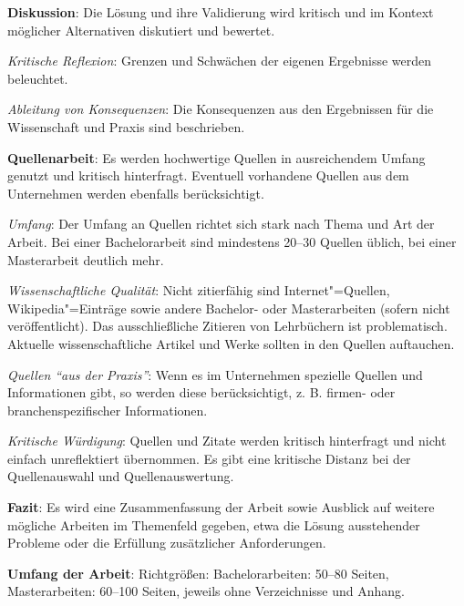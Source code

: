 \begin{checklist}
\begin{checklist}
    \end{checklist}
  \item \textbf{Diskussion}: Die Lösung und ihre Validierung wird kritisch und im Kontext möglicher Alternativen diskutiert und bewertet.
    \begin{checklist}
        \item \textit{Kritische Reflexion}: Grenzen und Schwächen der eigenen Ergebnisse werden beleuchtet.
        \item \textit{Ableitung von Konsequenzen}: Die Konsequenzen aus den Ergebnissen für die Wissenschaft und Praxis sind beschrieben.
    \end{checklist}
  \item \textbf{Quellenarbeit}: Es werden hochwertige Quellen in ausreichendem Umfang genutzt und kritisch hinterfragt. Eventuell vorhandene Quellen aus dem Unternehmen werden ebenfalls berücksichtigt.
    \begin{checklist}
        \item \textit{Umfang}: Der Umfang an Quellen richtet sich stark nach Thema und Art der Arbeit. Bei einer Bachelorarbeit sind mindestens 20--30 Quellen üblich, bei einer Masterarbeit deutlich mehr.
        \item \textit{Wissenschaftliche Qualität}: Nicht zitierfähig sind Internet"=Quellen, Wikipedia"=Einträge sowie andere Bachelor- oder Masterarbeiten (sofern nicht veröffentlicht). Das ausschließliche Zitieren von Lehrbüchern ist problematisch. Aktuelle wissenschaftliche Artikel und Werke sollten in den Quellen auftauchen.
        \item \textit{Quellen \enquote{aus der Praxis}}: Wenn es im Unternehmen spezielle Quellen und Informationen gibt, so werden diese berücksichtigt, z. B. firmen- oder branchenspezifischer Informationen.
        \item \textit{Kritische Würdigung}: Quellen und Zitate werden kritisch hinterfragt und nicht einfach unreflektiert übernommen. Es gibt eine kritische Distanz bei der Quellenauswahl und Quellenauswertung.
    \end{checklist}
  \item \textbf{Fazit}: Es wird eine Zusammenfassung der Arbeit sowie Ausblick auf weitere mögliche Arbeiten im Themenfeld gegeben, etwa die Lösung ausstehender Probleme oder die Erfüllung zusätzlicher Anforderungen.
  \item \textbf{Umfang der Arbeit}: Richtgrößen: Bachelorarbeiten: 50--80 Seiten, Masterarbeiten: 60--100 Seiten, jeweils ohne Verzeichnisse und Anhang.
\end{checklist}

